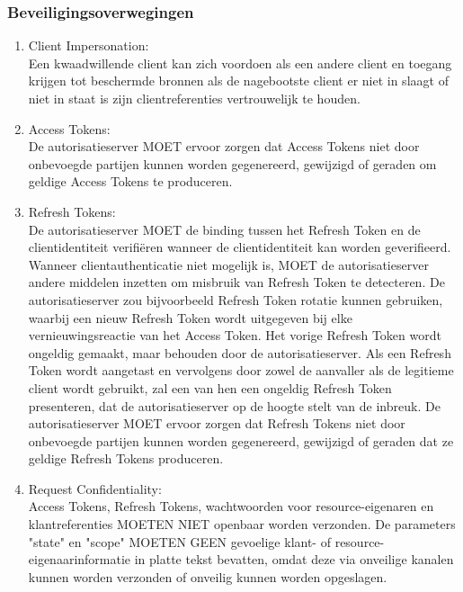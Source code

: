 \subsubsection{Beveiligingsoverwegingen}
\label{subsubsec:beveiligingsoverwegingen}
\begin{enumerate}[label=\textbf{-}]
    \item Client Impersonation: \\
    Een kwaadwillende client kan zich voordoen als een andere client en toegang krijgen tot beschermde bronnen als de nagebootste client er niet in slaagt of niet in staat is zijn clientreferenties vertrouwelijk te houden.

    \item Access Tokens: \\
    De autorisatieserver MOET ervoor zorgen dat Access Tokens niet door onbevoegde partijen kunnen worden gegenereerd, gewijzigd of geraden om geldige Access Tokens te produceren.

    \item Refresh Tokens: \\
    De autorisatieserver MOET de binding tussen het Refresh Token en de clientidentiteit verifiëren wanneer de clientidentiteit kan worden geverifieerd. Wanneer clientauthenticatie niet mogelijk is, MOET de autorisatieserver andere middelen inzetten om misbruik van Refresh Token te detecteren. De autorisatieserver zou bijvoorbeeld Refresh Token rotatie kunnen gebruiken, waarbij een nieuw Refresh Token wordt uitgegeven bij elke vernieuwingsreactie van het Access Token. Het vorige Refresh Token wordt ongeldig gemaakt, maar behouden door de autorisatieserver. Als een Refresh Token wordt aangetast en vervolgens door zowel de aanvaller als de legitieme client wordt gebruikt, zal een van hen een ongeldig Refresh Token presenteren, dat de autorisatieserver op de hoogte stelt van de inbreuk. De autorisatieserver MOET ervoor zorgen dat Refresh Tokens niet door onbevoegde partijen kunnen worden gegenereerd, gewijzigd of geraden dat ze geldige Refresh Tokens produceren.

    \item Request Confidentiality: \\
    Access Tokens, Refresh Tokens, wachtwoorden voor resource-eigenaren en klantreferenties MOETEN NIET openbaar worden verzonden. De parameters "state" en "scope" MOETEN GEEN gevoelige klant- of resource-eigenaarinformatie in platte tekst bevatten, omdat deze via onveilige kanalen kunnen worden verzonden of onveilig kunnen worden opgeslagen.
\end{enumerate}


